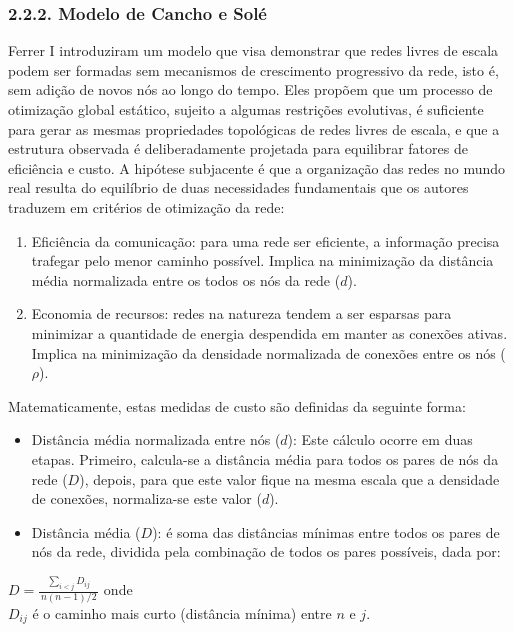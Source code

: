\documentclass[12pt,oneside,a4paper,brazil,sumario=tradicional]{abntex2}
\begin{document}
\subsubsection*{2.2.2. Modelo de Cancho e Solé}
Ferrer I  introduziram um modelo que visa demonstrar que redes livres de escala podem ser formadas sem mecanismos de crescimento progressivo da rede, isto é, sem adição de novos nós ao longo do tempo. Eles propõem que um processo de otimização global estático, sujeito a algumas restrições evolutivas, é suficiente para gerar as mesmas propriedades topológicas de redes livres de escala, e que a estrutura observada é deliberadamente projetada para equilibrar fatores de eficiência e custo. A hipótese subjacente é que a organização das redes no mundo real resulta do equilíbrio de duas necessidades fundamentais que os autores traduzem em critérios de otimização da rede:

\begin{enumerate}
  \item Eficiência da comunicação: para uma rede ser eficiente, a informação precisa trafegar pelo menor caminho possível. Implica na minimização da distância média normalizada entre os todos os nós da rede ($d$).
  \item Economia de recursos: redes na natureza tendem a ser esparsas para minimizar a quantidade de energia despendida em manter as conexões ativas. Implica na minimização da densidade normalizada de conexões entre os nós ($\rho$).
\end{enumerate}
Matematicamente, estas medidas de custo são definidas da seguinte forma:

\begin{itemize}
  \item Distância média normalizada entre nós ($d$): Este cálculo ocorre em duas etapas. Primeiro, calcula-se a distância média para todos os pares de nós da rede ($D$), depois, para que este valor fique na mesma escala que a densidade de conexões, normaliza-se este valor ($d$).
  \item Distância média ($D$): é soma das distâncias mínimas entre todos os pares de nós da rede, dividida pela combinação de todos os pares possíveis, dada por:
\end{itemize}
$D = \frac{\sum_{i<j} D_{ij}}{\,n(n-1)/2\,}$ onde \\$D_{ij}$ é o caminho mais curto (distância mínima) entre $n$ e $j$.
\end{document}
